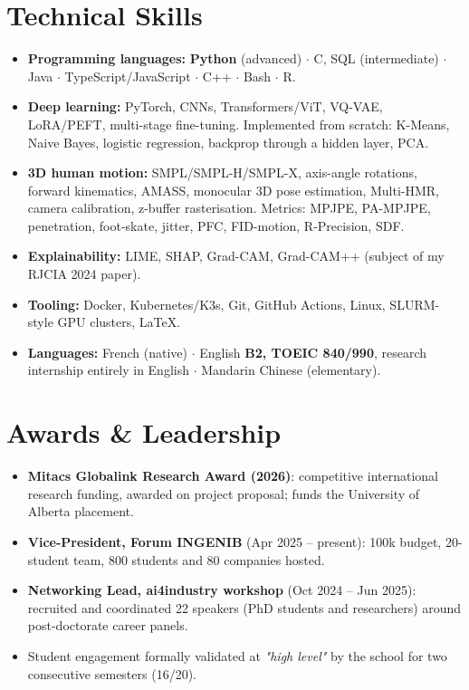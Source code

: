 \documentclass[10pt, letterpaper]{article}
\begin{document}
\section{Technical Skills}
\begin{itemize}
    \item \textbf{Programming languages:} \textbf{Python} (advanced) $\cdot$ C, SQL (intermediate) $\cdot$ Java $\cdot$ TypeScript/JavaScript $\cdot$ C++ $\cdot$ Bash $\cdot$ R.
    \item \textbf{Deep learning:} PyTorch, CNNs, Transformers/ViT, VQ-VAE, LoRA/PEFT, multi-stage fine-tuning. Implemented from scratch: K-Means, Naive Bayes, logistic regression, backprop through a hidden layer, PCA.
    \item \textbf{3D human motion:} SMPL/SMPL-H/SMPL-X, axis-angle rotations, forward kinematics, AMASS, monocular 3D pose estimation, Multi-HMR, camera calibration, z-buffer rasterisation. Metrics: MPJPE, PA-MPJPE, penetration, foot-skate, jitter, PFC, FID-motion, R-Precision, SDF.
    \item \textbf{Explainability:} LIME, SHAP, Grad-CAM, Grad-CAM++ (subject of my RJCIA 2024 paper).
    \item \textbf{Tooling:} Docker, Kubernetes/K3s, Git, GitHub Actions, Linux, SLURM-style GPU clusters, \LaTeX{}.
    \item \textbf{Languages:} French (native) $\cdot$ English \textbf{B2, TOEIC 840/990}, research internship entirely in English $\cdot$ Mandarin Chinese (elementary).
\end{itemize}

\section{Awards \& Leadership}
\begin{itemize}
    \item \textbf{Mitacs Globalink Research Award (2026)}: competitive international research funding, awarded on project proposal; funds the University of Alberta placement.
    \item \textbf{Vice-President, Forum INGENIB} (Apr 2025 -- present): \texteuro{}100k budget, 20-student team, 800 students and 80 companies hosted.
    \item \textbf{Networking Lead, ai4industry workshop} (Oct 2024 -- Jun 2025): recruited and coordinated 22 speakers (PhD students and researchers) around post-doctorate career panels.
    \item Student engagement formally validated at \textit{"high level"} by the school for two consecutive semesters (16/20).
\end{itemize}
\end{document}
